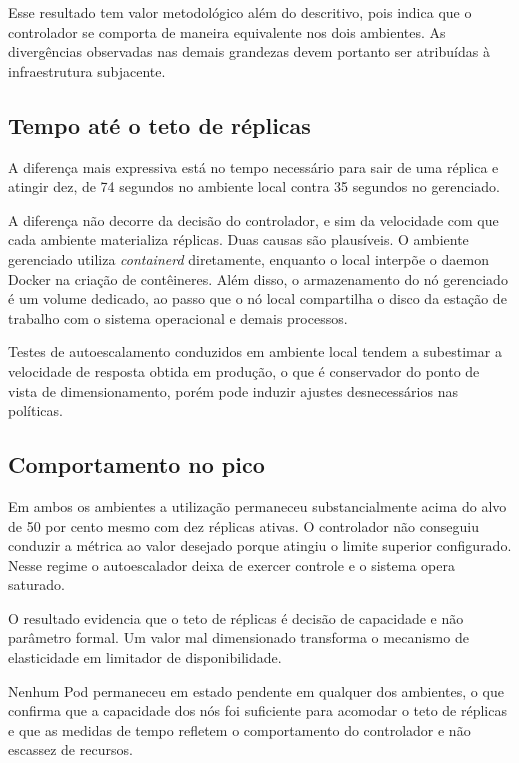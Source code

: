 \documentclass[12pt]{article}
\begin{document}
Esse resultado tem valor metodológico além do descritivo, pois indica que o
controlador se comporta de maneira equivalente nos dois ambientes. As
divergências observadas nas demais grandezas devem portanto ser atribuídas à
infraestrutura subjacente.

\subsection{Tempo até o teto de réplicas}

A diferença mais expressiva está no tempo necessário para sair de uma réplica e
atingir dez, de 74 segundos no ambiente local contra 35 segundos no gerenciado.

A diferença não decorre da decisão do controlador, e
sim da velocidade com que cada ambiente materializa réplicas. Duas causas são
plausíveis. O ambiente gerenciado utiliza \emph{containerd} diretamente,
enquanto o local interpõe o daemon Docker na criação de contêineres. Além disso,
o armazenamento do nó gerenciado é um volume dedicado, ao passo que o nó local
compartilha o disco da estação de trabalho com o sistema operacional e demais
processos.

Testes de autoescalamento conduzidos em
ambiente local tendem a subestimar a velocidade de resposta obtida em produção,
o que é conservador do ponto de vista de dimensionamento, porém pode induzir
ajustes desnecessários nas políticas.

\subsection{Comportamento no pico}

Em ambos os ambientes a utilização permaneceu substancialmente acima do alvo de
50 por cento mesmo com dez réplicas ativas. O controlador não conseguiu conduzir
a métrica ao valor desejado porque atingiu o limite superior configurado. Nesse
regime o autoescalador deixa de exercer controle e o sistema opera saturado.

O resultado evidencia que o teto de réplicas é decisão de capacidade e não
parâmetro formal. Um valor mal dimensionado transforma o mecanismo de
elasticidade em limitador de disponibilidade.

Nenhum Pod permaneceu em estado pendente em qualquer dos ambientes, o que
confirma que a capacidade dos nós foi suficiente para acomodar o teto de
réplicas e que as medidas de tempo refletem o comportamento do controlador e não
escassez de recursos.
\end{document}
